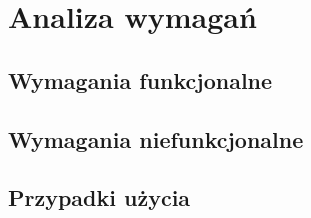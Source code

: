 \newpage %
\section{Analiza wymagań}
\subsection{Wymagania funkcjonalne}
\subsection{Wymagania niefunkcjonalne}
\subsection{Przypadki użycia}